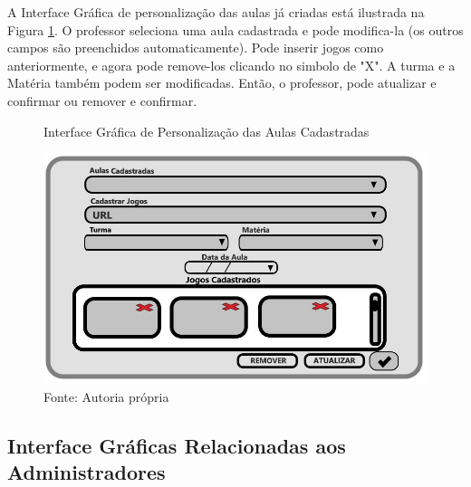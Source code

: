 \documentclass{utfpr-pg}
\begin{document}
    A Interface Gráfica de personalização das aulas já criadas está ilustrada na Figura \ref{fig:9}. O professor seleciona uma aula cadastrada  e pode modifica-la (os outros campos são preenchidos automaticamente). Pode inserir jogos como anteriormente, e agora pode remove-los clicando no simbolo de "X". A turma e a Matéria também podem ser modificadas. Então, o professor, pode atualizar e confirmar ou remover e confirmar.
        \begin{figure}[H]
            \centering
            \captionsetup{width=0.9\textwidth}
            \caption{Interface Gráfica de Personalização das Aulas Cadastradas}
            \includegraphics[width=\linewidth]{fotos/9.jpg}
            \caption*{Fonte: Autoria própria}
            \label{fig:9}
        \end{figure}
    
    \subsection{Interface Gráficas Relacionadas aos Administradores}
    
\end{document}
